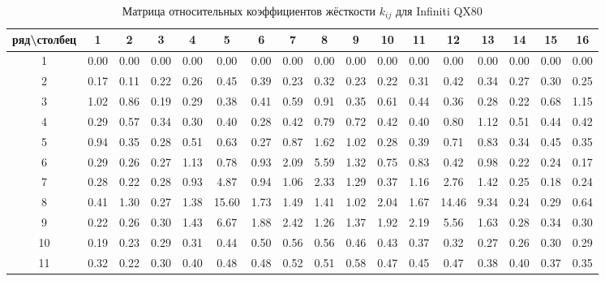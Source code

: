 \begin{table}[h]
\centering
\footnotesize
\caption{Матрица относительных коэффициентов жёсткости $k_{ij}$ для Infiniti QX80}
\begin{tabular}{c|cccccccccccccccc}
\hline
ряд\textbackslash столбец & 1 & 2 & 3 & 4 & 5 & 6 & 7 & 8 & 9 & 10 & 11 & 12 & 13 & 14 & 15 & 16 \\
\hline
1 & 0.00 & 0.00 & 0.00 & 0.00 & 0.00 & 0.00 & 0.00 & 0.00 & 0.00 & 0.00 & 0.00 & 0.00 & 0.00 & 0.00 & 0.00 & 0.00 \\
2 & 0.17 & 0.11 & 0.22 & 0.26 & 0.45 & 0.39 & 0.23 & 0.32 & 0.23 & 0.22 & 0.31 & 0.42 & 0.34 & 0.27 & 0.30 & 0.25 \\
3 & 1.02 & 0.86 & 0.19 & 0.29 & 0.38 & 0.41 & 0.59 & 0.91 & 0.35 & 0.61 & 0.44 & 0.36 & 0.28 & 0.22 & 0.68 & 1.15 \\
4 & 0.29 & 0.57 & 0.34 & 0.30 & 0.40 & 0.28 & 0.42 & 0.79 & 0.72 & 0.42 & 0.40 & 0.80 & 1.12 & 0.51 & 0.44 & 0.42 \\
5 & 0.94 & 0.35 & 0.28 & 0.51 & 0.63 & 0.27 & 0.87 & 1.62 & 1.02 & 0.28 & 0.39 & 0.71 & 0.83 & 0.34 & 0.45 & 0.35 \\
6 & 0.29 & 0.26 & 0.27 & 1.13 & 0.78 & 0.93 & 2.09 & 5.59 & 1.32 & 0.75 & 0.83 & 0.42 & 0.98 & 0.22 & 0.24 & 0.17 \\
7 & 0.28 & 0.22 & 0.28 & 0.93 & 4.87 & 0.94 & 1.06 & 2.33 & 1.29 & 0.37 & 1.16 & 2.76 & 1.42 & 0.25 & 0.18 & 0.24 \\
8 & 0.41 & 1.30 & 0.27 & 1.38 & 15.60 & 1.73 & 1.49 & 1.41 & 1.02 & 2.04 & 1.67 & 14.46 & 9.34 & 0.24 & 0.29 & 0.64 \\
9 & 0.22 & 0.26 & 0.30 & 1.43 & 6.67 & 1.88 & 2.42 & 1.26 & 1.37 & 1.92 & 2.19 & 5.56 & 1.63 & 0.28 & 0.34 & 0.30 \\
10 & 0.19 & 0.23 & 0.29 & 0.31 & 0.44 & 0.50 & 0.56 & 0.56 & 0.46 & 0.43 & 0.37 & 0.32 & 0.27 & 0.26 & 0.30 & 0.29 \\
11 & 0.32 & 0.22 & 0.30 & 0.40 & 0.48 & 0.48 & 0.52 & 0.51 & 0.58 & 0.47 & 0.45 & 0.47 & 0.38 & 0.40 & 0.37 & 0.35 \\
\hline
\end{tabular}
\label{tab:k_infiniti}
\end{table}
